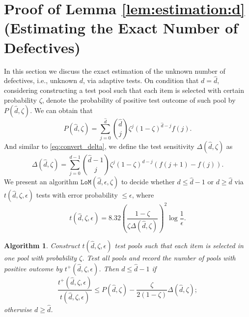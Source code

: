 \documentclass[onecolumn,letterpaper]{IEEEtran}
\newtheorem{algo}{Algorithm}
\newcommand{\lom}{{\texttt{LoM}}}
\newcommand{\lomerr}{{\epsilon}}
\newcommand{\ud}{{\hat{d}}}
\newcommand{\lomp}{{P}}
\newcommand{\lomcp}{{\zeta}}
\newcommand{\lomrs}{{t(\ud,\lomcp,\lomerr)}}
\newcommand{\lompo}{{t^{+}(\ud,\lomcp,\lomerr)}}
\newcommand{\lompp}{{\lomp(\ud,\lomcp)}}
\newcommand{\lompgap}{{\Delta(\ud,\lomcp)}}
\begin{document}
\section{Proof of Lemma \ref{lem:estimation:d} (Estimating the Exact Number of Defectives)}
\label{app:esti_d}
\iffalse
In this section we discuss the exact estimation of the unknown number of defectives, i.e., unknown $d$, via adaptive tests. On condition that $d = \ud$, considering constructing a test pool such that each item is selected with certain probability $\lomcp$, denote the probability of positive test outcome of such pool by $\lompp$. We can obtain that 
\begin{equation} \label{eq:lompp}
    \lompp = \sum\limits_{j=0}^{\ud} \binom{\ud}{j} \lomcp^j (1-\lomcp)^{\ud-j} f(j). 
\end{equation}
And similar to \eqref{eq:convert_delta}, we define the test sensitivity $\lompgap$ as 
\begin{equation} \label{eq:def:lompgap}
    \lompgap = \sum\limits_{j=0}^{\ud-1} \binom{\ud-1}{j} \lomcp^j (1-\lomcp)^{\ud-j} (f(j+1) - f(j)).
\end{equation}
We present an algorithm $\lom(\ud,\lomerr,\lomcp)$ to decide whether $d \le \ud-1$ or $d \ge \ud$ via $\lomrs$ tests with error probability $\le \lomerr$, where 
\begin{equation} \label{eq:def:lomrs}
    \lomrs = 8.32 \left( \frac{1-\lomcp}{\lomcp \lompgap} \right)^2 \log \frac{1}{\lomerr}.
\end{equation}

\begin{algo} \label{algo:lom}
    Construct $\lomrs$ test pools such that each item is selected in one pool with probability $\lomcp$. Test all pools and record the number of pools with positive outcome by $\lompo$. Then $d \le \ud-1$ if 
    \begin{equation} \label{eq:lom_l}
        \frac{\lompo}{\lomrs} \le \lompp - \frac{\lomcp}{2(1-\lomcp)} \lompgap; 
    \end{equation}
    otherwise $d \ge \ud$. 
\end{algo}
\end{document}
